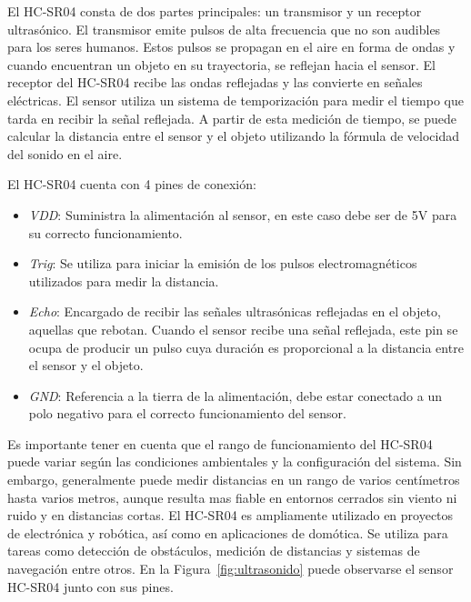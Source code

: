 El HC-SR04 consta de dos partes principales: un transmisor y un receptor ultrasónico. El transmisor emite pulsos de alta frecuencia que no son audibles para los seres humanos. Estos pulsos se propagan en el aire en forma de ondas y cuando encuentran un objeto en su trayectoria, se reflejan hacia el sensor. El receptor del HC-SR04 recibe las ondas reflejadas y las convierte en señales eléctricas. El sensor utiliza un sistema de temporización para medir el tiempo que tarda en recibir la señal reflejada. A partir de esta medición de tiempo, se puede calcular la distancia entre el sensor y el objeto utilizando la fórmula de velocidad del sonido en el aire.

El HC-SR04 cuenta con 4 pines de conexión:
\begin{itemize}
\item \textit{VDD}: Suministra la alimentación al sensor, en este caso debe ser de 5V para su correcto funcionamiento.

\item \textit{Trig}: Se utiliza para iniciar la emisión de los pulsos electromagnéticos utilizados para medir la distancia.

\item \textit{Echo}: Encargado de recibir las señales ultrasónicas reflejadas en el objeto, aquellas que rebotan. Cuando el sensor recibe una señal reflejada, este pin se ocupa de producir un pulso cuya duración es proporcional a la distancia entre el sensor y el objeto.

\item \textit{GND}: Referencia a la tierra de la alimentación, debe estar conectado a un polo negativo para el correcto funcionamiento del sensor.
\end{itemize}

Es importante tener en cuenta que el rango de funcionamiento del HC-SR04 puede variar según las condiciones ambientales y la configuración del sistema. Sin embargo, generalmente puede medir distancias en un rango de varios centímetros hasta varios metros, aunque resulta mas fiable en entornos cerrados sin viento ni ruido y en distancias cortas.
El HC-SR04 es ampliamente utilizado en proyectos de electrónica y robótica, así como en aplicaciones de domótica. Se utiliza para tareas como detección de obstáculos, medición de distancias y sistemas de navegación entre otros. En la Figura~\ref{fig:ultrasonido} puede observarse el sensor HC-SR04 junto con sus pines. 

